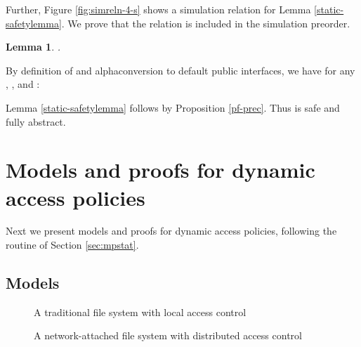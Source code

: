 \documentclass[10pt]{article}
\newtheorem{lemma}[theorem]{Lemma}
\begin{document}
Further, Figure \ref{fig:simreln-4-s} shows a simulation relation for Lemma \ref{static-safetylemma}. We prove that the relation  is included in the simulation preorder.
\begin{lemma} .
\end{lemma}
By definition of  and alphaconversion to default public interfaces, we have for any , , and :

Lemma \ref{static-safetylemma} follows by Proposition \ref{pf-prec}. Thus  is safe and fully abstract.  








\section{Models and proofs for dynamic access policies}\label{sec:mpdyn}
Next we present models and proofs for dynamic access policies, following the routine of Section \ref{sec:mpstat}.

\subsection{Models}








\begin{figure}
\hspace{-0.5cm}\fbox{\parbox{13.0cm}{\small








\fbox{\parbox{12.75cm}{




}}
}}
\caption{A traditional file system with local access control}
\label{fig:ts-sem-d}
\vspace{-0.2cm}
\end{figure}

\begin{figure}
\hspace{-0.5cm}\fbox{\parbox{13.0cm}{\small








\fbox{\parbox{12.75cm}{



}}
}}
\caption{A network-attached file system with distributed access control}
   \label{fig:nas-sem-d}
\end{figure}
\end{document}
